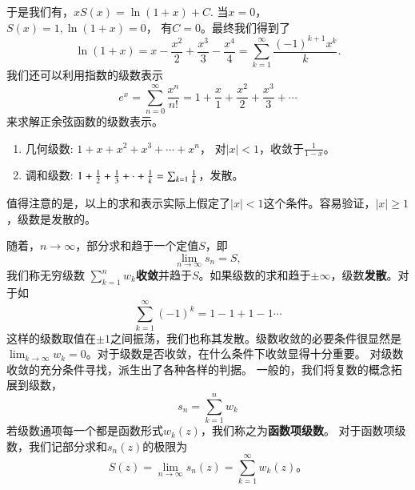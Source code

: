 于是我们有，$
    x S(x) = \ln (1 + x) + C .$
当$x=0$， $S(x) = 1, \ln (1+x) = 0$， 有$C=0$。最终我们得到了
\begin{equation}
    \ln (1+x) = x -  \frac{x^2}{2} + \frac{x^3}{3} - \frac{x^4}{4} = \sum_{k=1}^{\infty} \frac{(-1)^{k+1} x^k}{k} .
\end{equation}
我们还可以利用指数的级数表示
\begin{equation}
    e^{x} = \sum_{n=0}^{\infty} \frac{x^n}{n!} = 1 + \frac{x}{1} + \frac{x^2}{2} + \frac{x^3}{3} + \cdots 
\end{equation}
来求解正余弦函数的级数表示。
\begin{enumerate}
    \item 几何级数: $ 1 + x + x^2 + x^3 + \cdots + x^n$， 对$|x|<1$，收敛于$\frac{1}{1-x}$。
    \item 调和级数: $ 1 + {\frac{1}{2}} + \frac{1}{3} + \cdot +\frac{1}{k} = \sum_{k=1} \frac{1}{k}$，发散。
\end{enumerate}

值得注意的是，以上的求和表示实际上假定了$|x|<1$这个条件。容易验证，$|x|\geq 1$，级数是发散的。

随着，$n\to \infty$，部分求和趋于一个定值$S$，即
\begin{equation}
    \lim_{n\to \infty} s_n = S ,
\end{equation}
我们称无穷级数 $\sum_{k=1}^{n} w_{k}${\bf 收敛}并趋于$S$。如果级数的求和趋于$\pm \infty$，级数{\bf 发散}。对于如
\begin{equation}
    \sum_{k=1}^{\infty} (-1)^k = 1 - 1 + 1 - 1 \cdots 
\end{equation}
这样的级数取值在$\pm 1$之间振荡，我们也称其发散。级数收敛的必要条件很显然是$\lim_{k\to \infty} w_k = 0$。对于级数是否收敛，在什么条件下收敛显得十分重要。
对级数收敛的充分条件寻找，派生出了各种各样的判据。
一般的，我们将复数的概念拓展到级数，
\begin{equation}
    s_n = \sum_{k=1}^{n} w_{k}
\end{equation}
若级数通项每一个都是函数形式$w_k(z)$，我们称之为\textbf{函数项级数}。
对于函数项级数，我们记部分求和$s_n(z)$的极限为
\begin{equation}
    S(z) = \lim_{n\to \infty} s_n(z) =  \sum_{k=1}^{\infty} w_k (z)。 
\end{equation}


